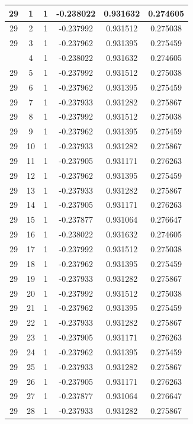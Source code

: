 \documentclass[12pt,a4paper]{article}
\numberwithin{equation}{section}
\numberwithin{figure}{section}
\numberwithin{table}{section}
\begin{document}
\begin{longtable}{|c|c|c|c|c|c|}
29 & 1 & 1 & -0.238022 & 0.931632 & 0.274605 \\ \hline
29 & 2 & 1 & -0.237992 & 0.931512 & 0.275038 \\ \hline
29 & 3 & 1 & -0.237962 & 0.931395 & 0.275459 \\ \hline
\pagebreak
29 & 4 & 1 & -0.238022 & 0.931632 & 0.274605 \\ \hline
29 & 5 & 1 & -0.237992 & 0.931512 & 0.275038 \\ \hline
29 & 6 & 1 & -0.237962 & 0.931395 & 0.275459 \\ \hline
29 & 7 & 1 & -0.237933 & 0.931282 & 0.275867 \\ \hline
29 & 8 & 1 & -0.237992 & 0.931512 & 0.275038 \\ \hline
29 & 9 & 1 & -0.237962 & 0.931395 & 0.275459 \\ \hline
29 & 10 & 1 & -0.237933 & 0.931282 & 0.275867 \\ \hline
29 & 11 & 1 & -0.237905 & 0.931171 & 0.276263 \\ \hline
29 & 12 & 1 & -0.237962 & 0.931395 & 0.275459 \\ \hline
29 & 13 & 1 & -0.237933 & 0.931282 & 0.275867 \\ \hline
29 & 14 & 1 & -0.237905 & 0.931171 & 0.276263 \\ \hline
29 & 15 & 1 & -0.237877 & 0.931064 & 0.276647 \\ \hline
29 & 16 & 1 & -0.238022 & 0.931632 & 0.274605 \\ \hline
29 & 17 & 1 & -0.237992 & 0.931512 & 0.275038 \\ \hline
29 & 18 & 1 & -0.237962 & 0.931395 & 0.275459 \\ \hline
29 & 19 & 1 & -0.237933 & 0.931282 & 0.275867 \\ \hline
29 & 20 & 1 & -0.237992 & 0.931512 & 0.275038 \\ \hline
29 & 21 & 1 & -0.237962 & 0.931395 & 0.275459 \\ \hline
29 & 22 & 1 & -0.237933 & 0.931282 & 0.275867 \\ \hline
29 & 23 & 1 & -0.237905 & 0.931171 & 0.276263 \\ \hline
29 & 24 & 1 & -0.237962 & 0.931395 & 0.275459 \\ \hline
29 & 25 & 1 & -0.237933 & 0.931282 & 0.275867 \\ \hline
29 & 26 & 1 & -0.237905 & 0.931171 & 0.276263 \\ \hline
29 & 27 & 1 & -0.237877 & 0.931064 & 0.276647 \\ \hline
29 & 28 & 1 & -0.237933 & 0.931282 & 0.275867 \\ \hline

\end{longtable}
\end{document}
